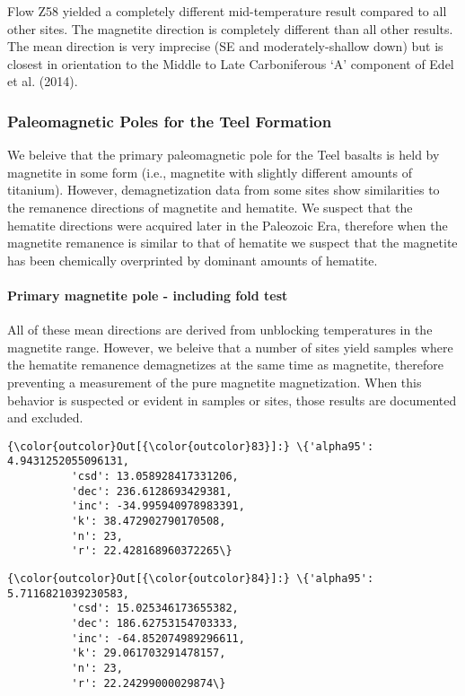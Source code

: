 \documentclass[11pt]{article}
\begin{document}
    Flow Z58 yielded a completely different mid-temperature result compared
to all other sites. The magnetite direction is completely different than
all other results. The mean direction is very imprecise (SE and
moderately-shallow down) but is closest in orientation to the Middle to
Late Carboniferous `A' component of Edel et al. (2014).

    \subsubsection{Paleomagnetic Poles for the Teel
Formation}\label{paleomagnetic-poles-for-the-teel-formation}

    We beleive that the primary paleomagnetic pole for the Teel basalts is
held by magnetite in some form (i.e., magnetite with slightly different
amounts of titanium). However, demagnetization data from some sites show
similarities to the remanence directions of magnetite and hematite. We
suspect that the hematite directions were acquired later in the
Paleozoic Era, therefore when the magnetite remanence is similar to that
of hematite we suspect that the magnetite has been chemically
overprinted by dominant amounts of hematite.

    \paragraph{Primary magnetite pole - including fold
test}\label{primary-magnetite-pole---including-fold-test}

    All of these mean directions are derived from unblocking temperatures in
the magnetite range. However, we beleive that a number of sites yield
samples where the hematite remanence demagnetizes at the same time as
magnetite, therefore preventing a measurement of the pure magnetite
magnetization. When this behavior is suspected or evident in samples or
sites, those results are documented and excluded.




            \begin{Verbatim}[commandchars=\\\{\}]
{\color{outcolor}Out[{\color{outcolor}83}]:} \{'alpha95': 4.9431252055096131,
          'csd': 13.058928417331206,
          'dec': 236.6128693429381,
          'inc': -34.995940978983391,
          'k': 38.472902790170508,
          'n': 23,
          'r': 22.428168960372265\}
\end{Verbatim}
        

            \begin{Verbatim}[commandchars=\\\{\}]
{\color{outcolor}Out[{\color{outcolor}84}]:} \{'alpha95': 5.7116821039230583,
          'csd': 15.025346173655382,
          'dec': 186.62753154703333,
          'inc': -64.852074989296611,
          'k': 29.061703291478157,
          'n': 23,
          'r': 22.24299000029874\}
\end{Verbatim}
        
\end{document}
